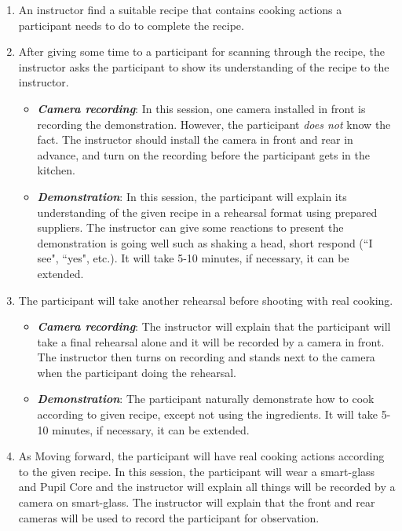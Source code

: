 \documentclass[fyp]{socreport}
\begin{document}
\begin{enumerate}
    \item An instructor find a suitable recipe that contains cooking actions a participant needs to do to complete the recipe.
    \item After giving some time to a participant for scanning through the recipe, the instructor asks the participant to show its understanding of the recipe to the instructor.
    \begin{itemize}
        \item \textbf{\textit{Camera recording}}: In this session, one camera installed in front is recording the demonstration. However, the participant \textit{does not} know the fact. The instructor should install the camera in front and rear in advance, and turn on the recording before the participant gets in the kitchen.
        \item \textbf{\textit{Demonstration}}: In this session, the participant will explain its understanding of the given recipe in a rehearsal format using prepared suppliers. The instructor can give some reactions to present the demonstration is going well such as shaking a head, short respond (``I see", ``yes", etc.). It will take 5-10 minutes, if necessary, it can be extended.
    \end{itemize}
    \item The participant will take another rehearsal before shooting with real cooking.
    \begin{itemize}
        \item \textbf{\textit{Camera recording}}: The instructor will explain that the participant will take a final rehearsal alone and it will be recorded by a camera in front. The instructor then turns on recording and stands next to the camera when the participant doing the rehearsal.
        \item \textbf{\textit{Demonstration}}: The participant naturally demonstrate how to cook according to given recipe, except not using the ingredients. It will take 5-10 minutes, if necessary, it can be extended.
    \end{itemize}
    \item As Moving forward, the participant will have real cooking actions according to the given recipe. In this session, the participant will wear a smart-glass and Pupil Core and the instructor will explain all things will be recorded by a camera on smart-glass. The instructor will explain that the front and rear cameras will be used to record the participant for observation.

\end{enumerate}
\end{document}
